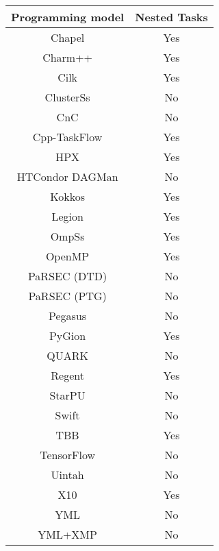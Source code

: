 \begin{tabular}{cc}
\hline
Programming model & Nested Tasks \\
\hline
Chapel & Yes\\
Charm++ & Yes\\
Cilk & Yes\\
ClusterSs & No\\
CnC & No\\
Cpp-TaskFlow & Yes\\
HPX & Yes\\
HTCondor DAGMan & No\\
Kokkos & Yes\\
Legion & Yes\\
OmpSs & Yes\\
OpenMP & Yes\\
PaRSEC (DTD) & No\\
PaRSEC (PTG) & No\\
Pegasus & No\\
PyGion & Yes\\
QUARK & No\\
Regent & Yes\\
StarPU & No\\
Swift & No\\
TBB & Yes\\
TensorFlow & No\\
Uintah & No\\
X10 & Yes\\
YML & No\\
YML+XMP & No\\
\hline
\end{tabular}
